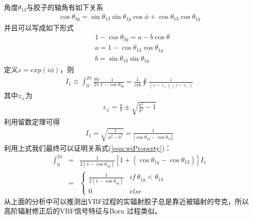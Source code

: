角度$\theta_{13}$与胶子的轴角有如下关系
\begin{eqnarray}
\cos\theta_{3g} = \sin\theta_{13}\sin\theta_{1g}\cos\phi + \cos\theta_{13}\cos\theta_{1g}
\end{eqnarray}
并且可以写成如下形式
\begin{equation}
\begin{split}
& 1-\cos\theta_{3g} = a - b \cos\theta \nonumber \\
& a = 1 - \cos\theta_{13}\cos\theta_{1g} \\
& b = \sin\theta_{13}\sin\theta_{1g}
\end{split}
\end{equation}
定义$z = exp(i\phi)$，则
\begin{eqnarray}
I_1 \equiv \int^{2\pi}_0 \frac{d\phi}{2\pi} \frac{1}{1-\cos\theta_{3g}} = \frac{1}{i\pi b}
\oint \frac{z}{(z-z_+)(z-z_-)}
\end{eqnarray}
其中$z_{\pm}$为
\begin{eqnarray}
z_{\pm} = \frac{a}{b} \pm \sqrt{\frac{a^2}{b^2} - 1}
\end{eqnarray}
利用留数定理可得
\begin{eqnarray}
I_1 = \sqrt{\frac{1}{a^2-b^2}} = \frac{1}{|\cos\theta_{1g}- \cos\theta_{13}|}
\end{eqnarray}
利用上式我们最终可以证明关系式(\ref{eqn:wiProperty})：
\begin{eqnarray}
\int^{2\pi}_0 &=& \frac{1}{2(1-\cos\theta_{1g})}[1+(\cos\theta_{1g}-\cos\theta_{13})]I_1
\nonumber \\
&=& \begin{cases}
\frac{1}{2(1-\cos\theta_{1g})} & if~\theta_{1g} < \theta_{13} \\
0 & else
\end{cases}
\end{eqnarray}
从上面的分析中可以推测出VBF过程的实辐射胶子总是靠近被辐射的夸克，所以高阶辐射修正后的VBF信号特征与Born
过程类似。

